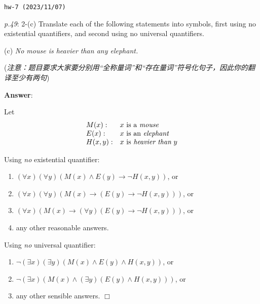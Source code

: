 \documentclass[UTF8,12pt,a4paper]{ctexart}
\begin{document}
\noindent\texttt{hw-7 (2023/11/07)}

\emph{p.49}: 2-(c) \quad
Translate each of the following statements into symbols, {\color{purple} first} using no existential quantifiers, and {\color{purple} second} using no universal quantifiers. 

\qquad (c) \hspace{3cm}  \textit{No mouse is heavier than any elephant.}

(\textit{注意：题目要求大家要分别用“全称量词”和“存在量词”符号化句子，因此你的翻译至少有两句})

\noindent\textbf{Answer}:   

Let 
\[\begin{array}{l l l}
	M(x):& x \text{ is a \textit{mouse}}\\
	E(x): & x \text{ is an \textit{elephant}}\\
	H(x,y): & x \text{ is \textit{heavier than}\;} y \\
\end{array}\]

Using \textit{no} existential quantifier: 
\begin{enumerate}
	\item $(\forall x) (\forall y) (M(x) \land E(y) \to \neg H(x,y))$, or
	
	\item $(\forall x) (\forall y) (M(x) \to (E(y) \to \neg H(x,y)))$, or
	
	\item $(\forall x)  (M(x) \to (\forall y) (E(y) \to \neg H(x,y)))$, or
	
	\item any other reasonable answers.
\end{enumerate}

\vspace{1em}

Using \textit{no} universal quantifier:
\begin{enumerate}
	\item $\neg (\exists x) (\exists y) (M(x) \land E(y) \land H(x,y))$, or
	
	\item $\neg (\exists x)  (M(x) \land (\exists y) (E(y) \land H(x,y)))$, or
	
	\item any other sensible answers. 
	\hfill $\Box$
\end{enumerate}
\end{document}
